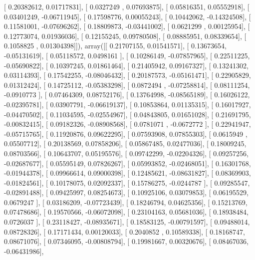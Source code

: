 \documentclass{article}
\begin{document}
       [ 0.20382612,  0.01717831],
       [ 0.0327249 ,  0.07693875],
       [ 0.05816351,  0.05552918],
       [ 0.03401249, -0.06711945],
       [ 0.17598776,  0.00055243],
       [ 0.10442062, -0.14324508],
       [ 0.11581001, -0.07696262],
       [ 0.18809873, -0.03441002],
       [ 0.0621299 ,  0.00125954],
       [ 0.12773074,  0.01936036],
       [ 0.12155245,  0.09780508],
       [ 0.08885951,  0.08339654],
       [ 0.1058825 ,  0.01304398]]), array([[ 0.21707155,  0.01541571],
       [ 0.13673654, -0.05131619],
       [ 0.05118572,  0.0498161 ],
       [ 0.10286149, -0.07857965],
       [ 0.22511225, -0.05690822],
       [ 0.10397245,  0.01861464],
       [ 0.21405942,  0.09167327],
       [ 0.13241302,  0.03114393],
       [ 0.17542255, -0.08046432],
       [ 0.20187573, -0.05161471],
       [ 0.22905829,  0.01312424],
       [ 0.14725112, -0.05383298],
       [ 0.0872494 , -0.07258814],
       [ 0.08111254, -0.0910773 ],
       [ 0.07464309,  0.08752176],
       [ 0.13764998, -0.08565189],
       [ 0.16026122, -0.02395781],
       [ 0.03907791, -0.06619137],
       [ 0.10853864,  0.01135315],
       [ 0.16017927, -0.04470502],
       [ 0.11034595, -0.02554967],
       [ 0.04843805,  0.01651028],
       [ 0.21691795, -0.00832415],
       [ 0.09182326, -0.08908568],
       [ 0.0781071 , -0.0672772 ],
       [ 0.22941947, -0.05715765],
       [ 0.11920876,  0.09622295],
       [ 0.07593908,  0.07855303],
       [ 0.0615949 ,  0.05507712],
       [ 0.20138569,  0.07858206],
       [ 0.05867485,  0.02477036],
       [ 0.18009245,  0.08703566],
       [ 0.10643707,  0.05195576],
       [ 0.09742299, -0.02204326],
       [ 0.09257256, -0.02687677],
       [ 0.05595149,  0.07826267],
       [ 0.05993852, -0.02468051],
       [ 0.16301768, -0.01944378],
       [ 0.09966614,  0.09000398],
       [ 0.12485621, -0.08631827],
       [ 0.08369903, -0.01824561],
       [ 0.10178075,  0.02092337],
       [ 0.15786275, -0.0244787 ],
       [ 0.09285547, -0.02891488],
       [ 0.09425997,  0.08254673],
       [ 0.10925106,  0.03079853],
       [ 0.06195529,  0.0679247 ],
       [ 0.03186209, -0.07723439],
       [ 0.18246794,  0.04625356],
       [ 0.15213769,  0.07478686],
       [ 0.19570566, -0.06072098],
       [ 0.23104163,  0.05681036],
       [ 0.18938484,  0.0726037 ],
       [ 0.23118427, -0.08935671],
       [ 0.18583125, -0.00791597],
       [ 0.09488014,  0.08728326],
       [ 0.17171434,  0.00120033],
       [ 0.2040852 ,  0.10589338],
       [ 0.18168747,  0.08671076],
       [ 0.07346095, -0.00808794],
       [ 0.19981667,  0.00320676],
       [ 0.08467036, -0.06431986],
\end{document}

